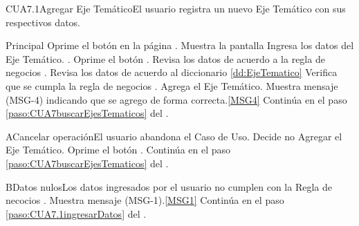 	\begin{UseCase}{CUA7.1}{Agregar Eje Temático}{El usuario registra un nuevo Eje Temático con sus respectivos datos.}
	\end{UseCase}
	\begin{UCtrayectoria}{Principal}
			\UCpaso[\UCactor] Oprime el botón  en la página .
			\UCpaso Muestra la pantalla  
			\UCpaso [\UCactor] Ingresa los datos del Eje Temático.  \label{paso:CUA7.1ingresarDatos}.
			\UCpaso [\UCactor] Oprime el botón .
			\UCpaso Revisa los datos de acuerdo a la regla de negocios . 
			\UCpaso Revisa los datos de acuerdo al diccionario \ref{dd:EjeTematico} 
			\UCpaso Verifica que se cumpla la regla de negocios .  
			\UCpaso Agrega el Eje Temático.
			\UCpaso Muestra mensaje (MSG-4) indicando que se agrego de forma correcta.\ref{MSG4}
			\UCpaso Continúa en el paso \ref{paso:CUA7buscarEjesTematicos} del .
	\end{UCtrayectoria}
	\newpage
	\begin{UCtrayectoriaA}{A}{Cancelar operación}{El usuario abandona el Caso de Uso.}
			\UCpaso[\UCactor] Decide no Agregar el Eje Temático.
			\UCpaso[\UCactor] Oprime el botón .
			\UCpaso Continúa en el paso \ref{paso:CUA7buscarEjesTematicos} del .
	\end{UCtrayectoriaA}
		
	\begin{UCtrayectoriaA}{B}{Datos nulos}{Los datos ingresados por el usuario  no cumplen con la Regla de necocios .}
			\UCpaso Muestra mensaje (MSG-1).\ref{MSG1}
			\UCpaso Continúa en el paso \ref{paso:CUA7.1ingresarDatos} del .
	\end{UCtrayectoriaA}

